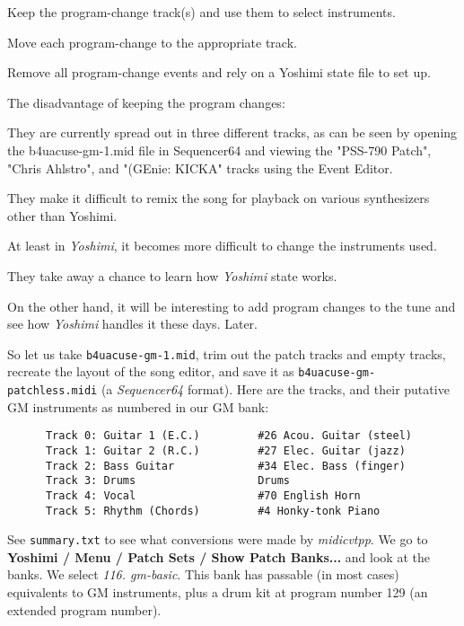    \begin{enumber}
      \item Keep the program-change track(s) and use them to select instruments.
      \item Move each program-change to the appropriate track.
      \item Remove all program-change events and rely on a Yoshimi state file
         to set up.
   \end{enumber}

The disadvantage of keeping the program changes:

   \begin{enumber}
      \item They are currently spread out in three different tracks, as can be
         seen by opening the b4uacuse-gm-1.mid file in Sequencer64 and viewing
         the "PSS-790 Patch", "Chris Ahlstro", and "(GEnie: KICKA" tracks using
         the Event Editor.
      \item They make it difficult to remix the song for playback on various
         synthesizers other than Yoshimi.
      \item At least in \textsl{Yoshimi}, it becomes more difficult to change
         the instruments used.
      \item They take away a chance to learn how \textsl{Yoshimi} state works.
   \end{enumber}

   On the other hand, it will be interesting to add program changes to the tune
   and see how \textsl{Yoshimi} handles it these days.  Later.

   So let us take \texttt{b4uacuse-gm-1.mid}, trim out the patch tracks and
   empty tracks, recreate the layout of the song editor, and save it as
   \texttt{b4uacuse-gm-patchless.midi} (a \textsl{Sequencer64} format).
   Here are the tracks, and their putative GM
   instruments as numbered in our GM bank:

   \begin{verbatim}
      Track 0: Guitar 1 (E.C.)         #26 Acou. Guitar (steel)
      Track 1: Guitar 2 (R.C.)         #27 Elec. Guitar (jazz)
      Track 2: Bass Guitar             #34 Elec. Bass (finger)
      Track 3: Drums                   Drums
      Track 4: Vocal                   #70 English Horn
      Track 5: Rhythm (Chords)         #4 Honky-tonk Piano
   \end{verbatim}

   See \texttt{summary.txt} to see what conversions were made by
   \textsl{midicvtpp}.  We go to
   \textbf{Yoshimi / Menu / Patch Sets / Show Patch Banks...}
   and look at the banks.  We select \textsl{116. gm-basic}.
   This bank has passable (in most cases) equivalents
   to GM instruments, plus a drum kit at program number 129 (an extended
   program number).

